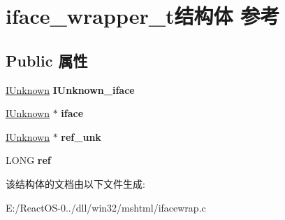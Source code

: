 \hypertarget{structiface__wrapper__t}{}\section{iface\+\_\+wrapper\+\_\+t结构体 参考}
\label{structiface__wrapper__t}
\subsection*{Public 属性}
\begin{DoxyCompactItemize}
\item 
\mbox{\label{structiface__wrapper__t_a18c87b7381ef6ab38858f92d33879fdd}} 
\hyperlink{interface_i_unknown}{I\+Unknown} {\bfseries I\+Unknown\+\_\+iface}
\item 
\mbox{\label{structiface__wrapper__t_ae68e445374c2e977eb3e749cf756746b}} 
\hyperlink{interface_i_unknown}{I\+Unknown} $\ast$ {\bfseries iface}
\item 
\mbox{\label{structiface__wrapper__t_ae57e14c60223cc4acfb7ec1021e815d6}} 
\hyperlink{interface_i_unknown}{I\+Unknown} $\ast$ {\bfseries ref\+\_\+unk}
\item 
\mbox{\label{structiface__wrapper__t_af04d170af81e5526a2376737fffda528}} 
L\+O\+NG {\bfseries ref}
\end{DoxyCompactItemize}


该结构体的文档由以下文件生成\+:\begin{DoxyCompactItemize}
\item 
E\+:/\+React\+O\+S-\/0../dll/win32/mshtml/ifacewrap.\+c\end{DoxyCompactItemize}
